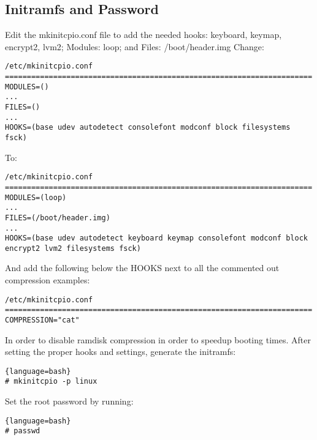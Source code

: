 \subsection{Initramfs and Password}
Edit the mkinitcpio.conf file to add the needed hooks: keyboard, keymap, encrypt2, lvm2; Modules: loop; and Files: /boot/header.img Change:
\begin{verbatim}
/etc/mkinitcpio.conf
======================================================================
MODULES=()
...
FILES=()
...
HOOKS=(base udev autodetect consolefont modconf block filesystems fsck)
\end{verbatim}
To:
\begin{verbatim}
/etc/mkinitcpio.conf
======================================================================
MODULES=(loop)
...
FILES=(/boot/header.img)
...
HOOKS=(base udev autodetect keyboard keymap consolefont modconf block encrypt2 lvm2 filesystems fsck)
\end{verbatim}
And add the following below the HOOKS next to all the commented out compression examples:
\begin{verbatim}
/etc/mkinitcpio.conf
======================================================================
COMPRESSION="cat"
\end{verbatim}
In order to disable ramdisk compression in order to speedup booting times.
After setting the proper hooks and settings, generate the initramfs:
\begin{lstlisting}{language=bash}
# mkinitcpio -p linux
\end{lstlisting}
Set the root password by running:
\begin{lstlisting}{language=bash}
# passwd
\end{lstlisting}

